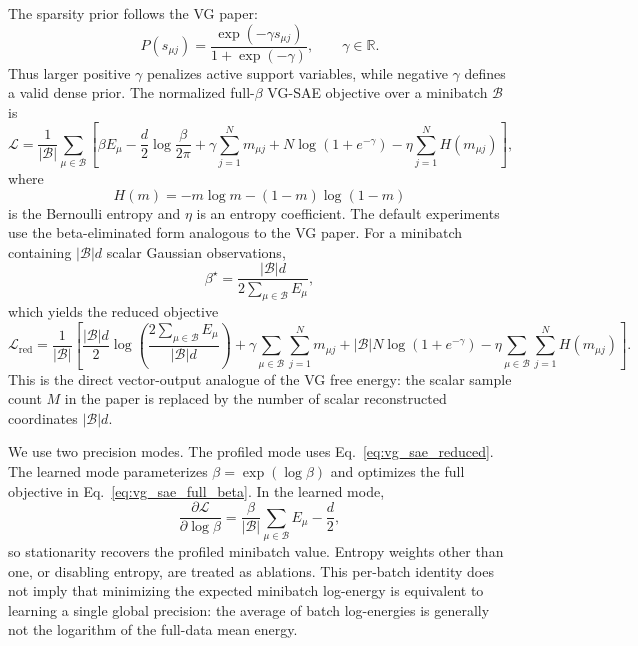 The sparsity prior follows the VG paper:
\begin{equation}
    P(s_{\mu j}) =
    \frac{\exp(-\gamma s_{\mu j})}{1+\exp(-\gamma)},
    \qquad \gamma \in \mathbb{R} .
\end{equation}
Thus larger positive $\gamma$ penalizes active support variables, while
negative $\gamma$ defines a valid dense prior. The normalized full-$\beta$
VG-SAE objective over a
minibatch $\mathcal{B}$ is
\begin{equation}
    \mathcal{L}
    =
    \frac{1}{|\mathcal{B}|}
    \sum_{\mu \in \mathcal{B}}
    \left[
        \beta E_\mu
        - \frac{d}{2}\log\frac{\beta}{2\pi}
        +
        \gamma \sum_{j=1}^{N} m_{\mu j}
        + N\log(1+e^{-\gamma})
        -
        \eta \sum_{j=1}^{N} H(m_{\mu j})
    \right],
    \label{eq:vg_sae_full_beta}
\end{equation}
where
\begin{equation}
    H(m)=-m\log m-(1-m)\log(1-m)
\end{equation}
is the Bernoulli entropy and $\eta$ is an entropy coefficient. The default
experiments use the beta-eliminated form analogous to the VG paper. For a
minibatch containing $|\mathcal{B}|d$ scalar Gaussian observations,
\begin{equation}
    \beta^\star =
    \frac{|\mathcal{B}|d}{2\sum_{\mu \in \mathcal{B}} E_\mu},
\end{equation}
which yields the reduced objective
\begin{equation}
    \mathcal{L}_{\mathrm{red}}
    =
    \frac{1}{|\mathcal{B}|}
    \left[
        \frac{|\mathcal{B}|d}{2}
        \log\left(
            \frac{2\sum_{\mu \in \mathcal{B}}E_\mu}{|\mathcal{B}|d}
        \right)
        +
        \gamma
        \sum_{\mu \in \mathcal{B}}\sum_{j=1}^{N}m_{\mu j}
        + |\mathcal{B}|N\log(1+e^{-\gamma})
        -
        \eta
        \sum_{\mu \in \mathcal{B}}\sum_{j=1}^{N}H(m_{\mu j})
    \right].
    \label{eq:vg_sae_reduced}
\end{equation}
This is the direct vector-output analogue of the VG free energy: the scalar
sample count $M$ in the paper is replaced by the number of scalar reconstructed
coordinates $|\mathcal{B}|d$.

We use two precision modes.  The profiled mode uses
Eq.~\eqref{eq:vg_sae_reduced}.  The learned mode parameterizes
$\beta=\exp(\log\beta)$ and optimizes the full objective in
Eq.~\eqref{eq:vg_sae_full_beta}.  In the learned mode,
\begin{equation}
  \frac{\partial \mathcal{L}}{\partial\log\beta}
  = \frac{\beta}{|\mathcal{B}|}\sum_{\mu\in\mathcal{B}}E_\mu-\frac{d}{2},
\end{equation}
so stationarity recovers the profiled minibatch value.  Entropy weights other
than one, or disabling entropy, are treated as ablations.
This per-batch identity does not imply that minimizing the expected minibatch
log-energy is equivalent to learning a single global precision: the average of
batch log-energies is generally not the logarithm of the full-data mean energy.

